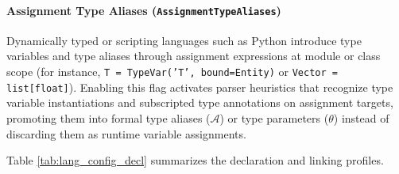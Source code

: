 \paragraph{Assignment Type Aliases (\texttt{AssignmentTypeAliases})}
Dynamically typed or scripting languages such as Python introduce
type variables and
type aliases through assignment expressions at module
or class scope
(for instance, \texttt{T = TypeVar('T', bound=Entity)} or
\texttt{Vector = list[float]}).
Enabling this flag activates parser heuristics that recognize type variable
instantiations and subscripted type annotations on assignment
targets, promoting them
into formal type aliases ($\mathcal{A}$) or type parameters
($\theta$) instead of
discarding them as runtime variable assignments.
%

Table \ref{tab:lang_config_decl} summarizes the declaration and
linking profiles.

